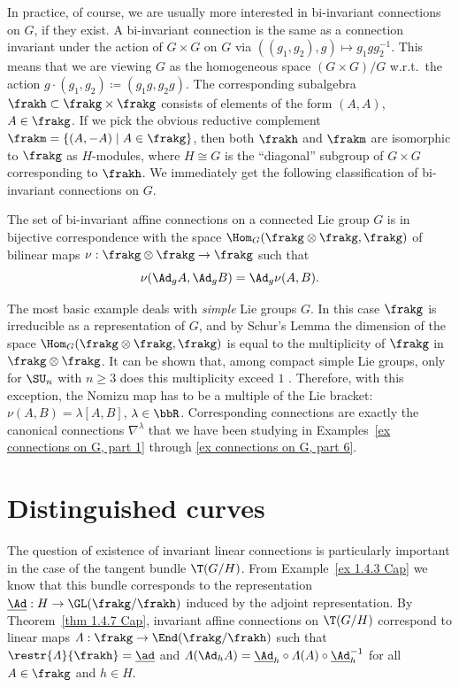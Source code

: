 In practice, of course, we are usually more interested in bi-invariant connections on $G$, if they exist. A bi-invariant connection is the same as a connection invariant under the action of $G\times G$ on $G$ via $((g_1,g_2),g)\mapsto g_1gg_2^{-1}$. This means that we are viewing $G$ as the homogeneous space $(G\times G)\slash G$ w.r.t.\ the action $g\cdot (g_1,g_2)\coloneqq (g_1g,g_2g)$. The corresponding subalgebra $\frakh\subset\frakg\times\frakg$ consists of elements of the form $(A,A)$, $A\in\frakg$. If we pick the obvious reductive complement $\frakm=\{(A,-A)\mid A\in\frakg\}$, then both $\frakh$ and $\frakm$ are isomorphic to $\frakg$ as $H$-modules, where $H\cong G$ is the ``diagonal'' subgroup of $G\times G$ corresponding to $\frakh$. We immediately get the following classification of bi-invariant connections on $G$.

\begin{cor}
    The set of bi-invariant affine connections on a connected Lie group $G$ is in bijective correspondence with the space $\Hom_G(\frakg\otimes\frakg,\frakg)$ of bilinear maps $\nu:\frakg\otimes\frakg\to \frakg$ such that 
    \[\nu(\Ad_g A,\Ad_g B)=\Ad_g \nu(A,B).\]
\end{cor}

The most basic example deals with \emph{simple} Lie groups $G$. In this case $\frakg$ is irreducible as a representation of $G$, and by Schur's Lemma the dimension of the space $\Hom_G(\frakg\otimes\frakg,\frakg)$ is equal to the multiplicity of $\frakg$ in $\frakg\otimes\frakg$. It can be shown that, among compact simple Lie groups, only for $\SU_n$ with $n\geq 3$ does this multiplicity exceed $1$ \cite{Laquer}. Therefore, with this exception, the Nomizu map has to be a multiple of the Lie bracket: $\nu(A,B)=\lambda[A,B]$, $\lambda\in\bbR$. Corresponding connections are exactly the canonical connections $\nabla^\lambda$ that we have been studying in Examples~\ref{ex connections on G, part 1} through \ref{ex connections on G, part 6}.







\section{Distinguished curves}


The question of existence of invariant linear connections is particularly important in the case of the tangent bundle $\T(G\slash H)$. From Example~\ref{ex 1.4.3 Cap} we know that this bundle corresponds to the representation $\underline{\Ad}:H\to \GL(\frakg\slash\frakh)$ induced by the adjoint representation. By Theorem~\ref{thm 1.4.7 Cap}, invariant affine connections on $\T(G\slash H)$ correspond to linear maps $\varLambda:\frakg\to \End(\frakg\slash\frakh)$ such that $\restr{\varLambda}{\frakh}=\underline{\ad}$ and $\varLambda(\Ad_h A)=\underline{\Ad}_h\circ\varLambda(A)\circ \underline{\Ad}_h^{-1}$ for all $A\in\frakg$ and $h\in H$.

